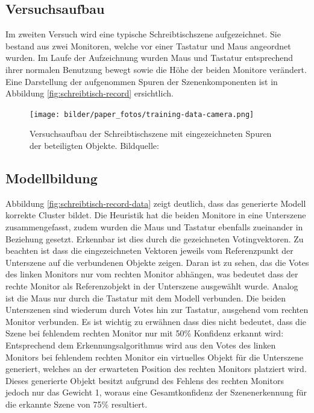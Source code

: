 \subsection{Versuchsaufbau}

Im zweiten Versuch wird eine typische Schreibtischszene aufgezeichnet.
Sie bestand aus zwei Monitoren, welche vor einer Tastatur und Maus angeordnet wurden.
Im Laufe der Aufzeichnung wurden Maus und Tastatur entsprechend ihrer normalen Benutzung bewegt sowie die Höhe der beiden Monitore verändert.
Eine Darstellung der aufgenommen Spuren der Szenenkomponenten ist in Abbildung \vref{fig:schreibtisch-record} ersichtlich.

\begin{figure}
  \centering
  \texttt{[image: bilder/paper\_fotos/training-data-camera.png]}
  \caption{Versuchsaufbau der Schreibtischszene mit eingezeichneten Spuren der beteiligten Objekte. Bildquelle: \cite{P.MeissnerandR.RecklingandR.JaekelandS.R.Schmidt-RohrandR.Dillmann2013}}
  \label{fig:schreibtisch-record}
\end{figure}

\subsection{Modellbildung}

Abbildung \vref{fig:schreibtisch-record-data} zeigt deutlich, dass das generierte Modell korrekte Cluster bildet.
Die Heuristik hat die beiden Monitore in eine Unterszene zusammengefasst, zudem wurden die Maus und Tastatur ebenfalls zueinander in Beziehung gesetzt.
Erkennbar ist dies durch die gezeichneten Votingvektoren.
Zu beachten ist dass die eingezeichneten Vektoren jeweils vom Referenzpunkt der Unterszene auf die verbundenen Objekte zeigen.
Daran ist zu sehen, das die Votes des linken Monitors nur vom rechten Monitor abhängen, was bedeutet dass der rechte Monitor als Referenzobjekt in der Unterszene ausgewählt wurde.
Analog ist die Maus nur durch die Tastatur mit dem Modell verbunden.
Die beiden Unterszenen sind wiederum durch Votes hin zur Tastatur, ausgehend vom rechten Monitor verbunden.
Es ist wichtig zu erwähnen dass dies nicht bedeutet, dass die Szene bei fehlendem rechten Monitor nur mit 50\% Konfidenz erkannt wird:\\
Entsprechend dem Erkennungsalgorithmus wird aus den Votes des linken Monitors bei fehlendem rechten Monitor ein virtuelles Objekt für die Unterszene generiert, welches an der erwarteten Position des rechten Monitors platziert wird.
Dieses generierte Objekt besitzt aufgrund des Fehlens des rechten Monitors jedoch nur das Gewicht 1, woraus eine Gesamtkonfidenz der Szenenerkennung für die erkannte Szene von 75\% resultiert.

